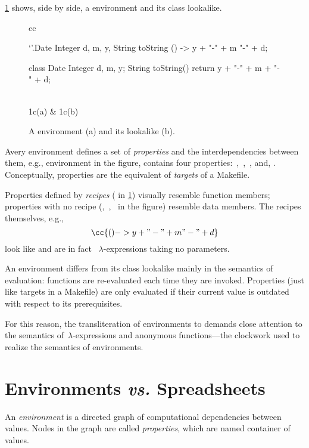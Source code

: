 \cref{figure:date} shows, side by side, a \Reap environment and its \Java
class lookalike.

\begin{figure}
  \caption{\label{figure:date}%
    A \Reap environment (a) and its \Java lookalike (b).
  }
  \begin{tabular}{cc}
    \begin{reap}
    `'.Date {
    Integer d, m, y,
    String toString () ->
    y + "-" + m "-" + d;
    }
    \end{reap}

    \begin{java}
    class Date {
    Integer d, m, y;
    String toString() {
    return
    y + "-" + m + "-" + d;
      }
    }
    \end{java}
      \\ \multicolumn1c{(a)} & \multicolumn1c{(b)}
  \end{tabular}
\end{figure}

Avery environment defines a set of \emph{properties} and the interdependencies
between them, e.g., environment  in the figure, contains four
properties:~,~,~, and, . Conceptually,
properties are the equivalent of \emph{targets} of a Makefile.

Properties defined by \emph{recipes} ( in \cref{figure:date})
visually resemble function members; properties with no recipe
(,~,~ in the figure) resemble data members.
The recipes themselves, e.g., \[
\cc{ () -> y + "-" + m "-" + d}
\] look like and are in fact \Java~$λ$-expressions taking no parameters.

An environment differs from its class lookalike mainly in the semantics of
evaluation: functions are re-evaluated each time they are invoked. Properties
(just like targets in a Makefile) are only evaluated if their current value
is outdated with respect to its prerequisites.

For this reason, the transliteration of environments to \Java demands close
attention to the semantics of~$λ$-expressions and anonymous functions---the
\Java clockwork used to realize the semantics of environments.

\section{Environments \emph{vs.} Spreadsheets}

An \emph{environment} is a directed graph of computational dependencies between
values. Nodes in the graph are called \emph{properties}, which are named
container of values.

